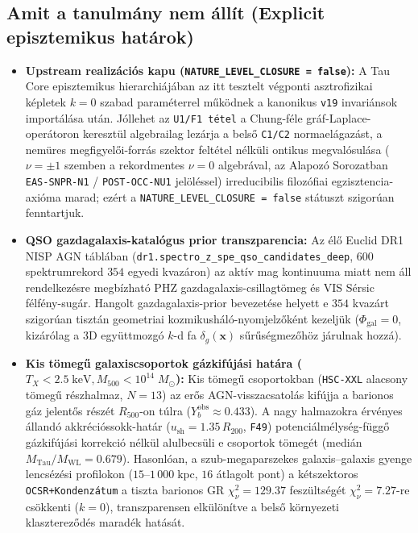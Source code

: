 \documentclass[11pt,a4paper]{article}
\begin{document}
\subsection{Amit a tanulmány nem állít (Explicit episztemikus határok)}
\begin{itemize}
  \item \textbf{Upstream realizációs kapu (\texttt{NATURE\_LEVEL\_CLOSURE = false}):} A Tau Core episztemikus hierarchiájában az itt tesztelt végponti asztrofizikai képletek $k = 0$ szabad paraméterrel működnek a kanonikus \texttt{v19} invariánsok importálása után. Jóllehet az \texttt{U1/F1 tétel} a Chung-féle gráf-Laplace-operátoron keresztül algebrailag lezárja a belső \texttt{C1/C2} normaelágazást, a nemüres megfigyelői-forrás szektor feltétel nélküli ontikus megvalósulása ($\nu = \pm 1$ szemben a rekordmentes $\nu = 0$ algebrával, az Alapozó Sorozatban \texttt{EAS-SNPR-N1} / \texttt{POST-OCC-NU1} jelöléssel) irreducibilis filozófiai egzisztencia-axióma marad; ezért a \texttt{NATURE\_LEVEL\_CLOSURE = false} státuszt szigorúan fenntartjuk.
  \item \textbf{QSO gazdagalaxis-katalógus prior transzparencia:} Az élő Euclid DR1 NISP AGN táblában (\texttt{dr1.\allowbreak spectro\_\allowbreak z\_\allowbreak spe\_\allowbreak qso\_\allowbreak candidates\_\allowbreak deep}, $600$ spektrumrekord $354$ egyedi kvazáron) az aktív mag kontinuuma miatt nem áll rendelkezésre megbízható PHZ gazdagalaxis-csillagtömeg és VIS Sérsic félfény-sugár. Hangolt gazdagalaxis-prior bevezetése helyett e $354$ kvazárt szigorúan tisztán geometriai kozmikusháló-nyomjelzőként kezeljük ($\Phi_{\mathrm{gal}} = 0$, kizárólag a 3D együttmozgó $k$-d fa $\delta_g(\mathbf{x})$ sűrűségmezőhöz járulnak hozzá).
  \item \textbf{Kis tömegű galaxiscsoportok gázkifújási határa ($T_X < 2.5\;\mathrm{keV}, M_{500} < 10^{14}\;M_\odot$):} Kis tömegű csoportokban (\texttt{HSC-XXL} alacsony tömegű részhalmaz, $N = 13$) az erős AGN-visszacsatolás kifújja a barionos gáz jelentős részét $R_{500}$-on túlra ($Y_b^{\mathrm{obs}} \approx 0.433$). A nagy halmazokra érvényes állandó akkrécióssokk-határ ($u_{\mathrm{sh}} = 1.35\,R_{200}$, \texttt{F49}) potenciálmélység-függő gázkifújási korrekció nélkül alulbecsüli e csoportok tömegét (medián $M_{\mathrm{Tau}}/M_{\mathrm{WL}} = 0.679$). Hasonlóan, a szub-megaparszekes galaxis--galaxis gyenge lencsézési profilokon ($15\text{--}1\,000\;\mathrm{kpc}$, $16$ átlagolt pont) a kétszektoros \texttt{OCSR+Kondenzátum} a tiszta barionos GR $\chi^2_\nu = 129.37$ feszültségét $\chi^2_\nu = 7.27$-re csökkenti ($k=0$), transzparensen elkülönítve a belső környezeti klasztereződés maradék hatását.

\end{itemize}
\end{document}

